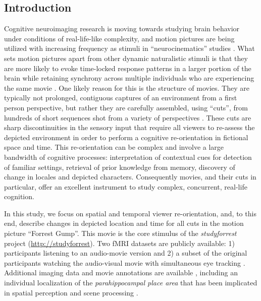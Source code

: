 \documentclass[10pt,a4paper]{article}
\begin{document}
\begin{multicols}{2}

\section*{Introduction}

Cognitive neuroimaging research is moving towards studying brain behavior under
conditions of real-life-like complexity, and motion pictures are being utilized
with increasing frequency as stimuli in ``neurocinematics'' studies
\citep{hasson_2008_neurocinematics}. What sets motion pictures apart from other
dynamic naturalistic stimuli is that they are more likely to evoke time-locked
response patterns in a larger portion of the brain while retaining synchrony
across multiple individuals who are experiencing the same movie
\citep{hasson_2009_natural_stim_review,lankinen_2014_MEG_during_movie}. One
likely reason for this is the structure of movies. They are typically not
prolonged, contiguous captures of an environment from a first person
perspective, but rather they are carefully assembled, using ``cuts'', from
hundreds of short sequences shot from a variety of perspectives
\citep{cutting_2011_changing_poetics_of_dissolve}. These cuts are sharp
discontinuities in the sensory input that require all viewers to re-assess the
depicted environment in order to perform a cognitive re-orientation in fictional
space and time. This re-orientation can be complex and involve a
large bandwidth of cognitive processes: interpretation of contextual cues for
detection of familiar settings,
retrieval of prior knowledge from memory, discovery of change in locales and
depicted characters. Consequently movies, and their cuts in particular, offer an
excellent instrument to study complex, concurrent, real-life cognition.

In this study, we focus on spatial and temporal viewer re-orientation, and, to
this end, describe changes in depicted location and time for all cuts in the
motion picture ``Forrest Gump''. This movie is the core stimulus of the
\textit{studyforrest} project (\url{http://studyforrest}). Two fMRI datasets
are publicly available: 1) participants listening to an audio-movie version
\citep{HBI+14} and 2) a subset of the original participants watching the
audio-visual movie with simultaneous eye tracking \citep{HAK+16}. Additional
imaging data and movie annotations are available \citep{HDH+2015,LRS+2015},
including an individual localization of the \textit{parahippocampal place area}
\citep{SKG+16} that has been implicated in spatial perception and scene
processing \citep{EK1998}.


\end{multicols}
\end{document}
